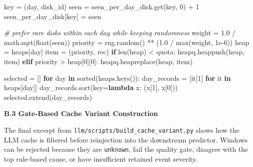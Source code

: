 \documentclass[
  11pt,
  a4paper]{article}
\newenvironment{Shaded}{}{}
\newcommand{\BuiltInTok}[1]{#1}
\newcommand{\CommentTok}[1]{\textcolor[rgb]{0.38,0.63,0.69}{\textit{#1}}}
\newcommand{\ControlFlowTok}[1]{\textcolor[rgb]{0.00,0.44,0.13}{\textbf{#1}}}
\newcommand{\DecValTok}[1]{\textcolor[rgb]{0.25,0.63,0.44}{#1}}
\newcommand{\FloatTok}[1]{\textcolor[rgb]{0.25,0.63,0.44}{#1}}
\newcommand{\KeywordTok}[1]{\textcolor[rgb]{0.00,0.44,0.13}{\textbf{#1}}}
\newcommand{\NormalTok}[1]{#1}
\newcommand{\OperatorTok}[1]{\textcolor[rgb]{0.40,0.40,0.40}{#1}}
\begin{document}
\begin{Shaded}
\begin{Highlighting}[]
\NormalTok{    key }\OperatorTok{=}\NormalTok{ (day, disk\_id)}
\NormalTok{    seen }\OperatorTok{=}\NormalTok{ seen\_per\_day\_disk.get(key, }\DecValTok{0}\NormalTok{) }\OperatorTok{+} \DecValTok{1}
\NormalTok{    seen\_per\_day\_disk[key] }\OperatorTok{=}\NormalTok{ seen}

    \CommentTok{\# prefer rare disks within each day while keeping randomness}
\NormalTok{    weight }\OperatorTok{=} \FloatTok{1.0} \OperatorTok{/}\NormalTok{ math.sqrt(}\BuiltInTok{float}\NormalTok{(seen))}
\NormalTok{    priority }\OperatorTok{=}\NormalTok{ rng.random() }\OperatorTok{**}\NormalTok{ (}\FloatTok{1.0} \OperatorTok{/} \BuiltInTok{max}\NormalTok{(weight, }\FloatTok{1e{-}6}\NormalTok{))}
\NormalTok{    heap }\OperatorTok{=}\NormalTok{ heaps[day]}
\NormalTok{    item }\OperatorTok{=}\NormalTok{ (priority, rec)}
    \ControlFlowTok{if} \BuiltInTok{len}\NormalTok{(heap) }\OperatorTok{\textless{}}\NormalTok{ quota:}
\NormalTok{        heapq.heappush(heap, item)}
    \ControlFlowTok{elif}\NormalTok{ priority }\OperatorTok{\textgreater{}}\NormalTok{ heap[}\DecValTok{0}\NormalTok{][}\DecValTok{0}\NormalTok{]:}
\NormalTok{        heapq.heapreplace(heap, item)}

\NormalTok{selected }\OperatorTok{=}\NormalTok{ []}
\ControlFlowTok{for}\NormalTok{ day }\KeywordTok{in} \BuiltInTok{sorted}\NormalTok{(heaps.keys()):}
\NormalTok{    day\_records }\OperatorTok{=}\NormalTok{ [it[}\DecValTok{1}\NormalTok{] }\ControlFlowTok{for}\NormalTok{ it }\KeywordTok{in}\NormalTok{ heaps[day]]}
\NormalTok{    day\_records.sort(key}\OperatorTok{=}\KeywordTok{lambda}\NormalTok{ x: (x[}\DecValTok{1}\NormalTok{], x[}\DecValTok{0}\NormalTok{]))}
\NormalTok{    selected.extend(day\_records)}
\end{Highlighting}
\end{Shaded}

\textbf{B.3 Gate-Based Cache Variant Construction}

The final excerpt from \texttt{llm/scripts/build\_cache\_variant.py}
shows how the LLM cache is filtered before reinjection into the
downstream predictor. Windows can be rejected because they are
\texttt{unknown}, fail the quality gate, disagree with the top
rule-based cause, or have insufficient retained event severity.
\end{document}
